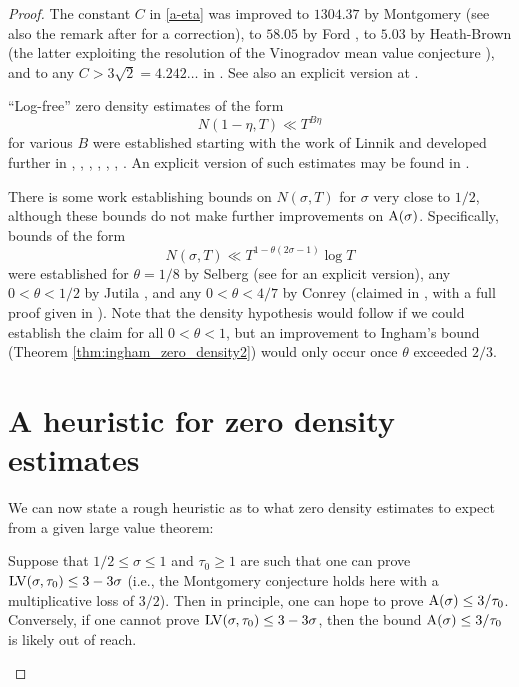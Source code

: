 \begin{proof}
The constant $C$ in \eqref{a-eta} was improved to $1304.37$ by Montgomery \cite[Theorem 12.3]{montgomery_topics_1971} (see also the remark after \cite[(11.97)]{ivic} for a correction), to $58.05$ by Ford \cite{FordZeta}, to $5.03$ by Heath-Brown \cite{heathbrown_new_2017} (the latter exploiting the resolution of the Vinogradov mean value conjecture \cite{bourgain_demeter_guth}), and to any $C > 3\sqrt{2}=4.242\dots$ in \cite{pintz_density_2023}. See also an explicit version at \cite{bellotti}.

``Log-free'' zero density estimates of the form
$$ N(1-\eta,T) \ll T^{B\eta}$$
for various $B$ were established starting with the work of Linnik \cite{linnik-1,linnik-2} and developed further in \cite{turan}, \cite{fogels}, \cite{bombieri_1974}, \cite{jutila_linnik}, \cite{gallagher_large_sieve}, \cite{graham_1978}, \cite{heath_brown_least_prime}. An explicit version of such estimates may be found in \cite{bellotti_2024}.

There is some work establishing bounds on $N(\sigma,T)$ for $\sigma$ very close to $1/2$, although these bounds do not make further improvements on $\mathrm{A}(\sigma)$.  Specifically, bounds of the form
$$ N(\sigma,T) \ll T^{1-\theta(2\sigma-1)} \log T$$
were established for $\theta=1/8$ by Selberg \cite{selberg_1946} (see \cite{simonic} for an explicit version), any $0 < \theta < 1/2$ by Jutila \cite{jutila-critical}, and any $0 < \theta < 4/7$ by Conrey (claimed in \cite{conrey_at_1989}, with a full proof given in \cite{baluyot_thesis}).  Note that the density hypothesis would follow if we could establish the claim for all $0 < \theta < 1$, but an improvement to Ingham's bound (Theorem \ref{thm:ingham_zero_density2}) would only occur once $\theta$ exceeded $2/3$.

\section{A heuristic for zero density estimates}

We can now state a rough heuristic as to what zero density estimates to expect from a given large value theorem:

\begin{heuristic}\label{lv-heuristic} Suppose that $1/2 \leq \sigma \leq 1$ and $\tau_0 \geq 1$ are such that one can prove $\mathrm{LV}(\sigma, \tau_0) \leq 3-3\sigma$ (i.e., the Montgomery conjecture holds here with a multiplicative loss of $3/2$).  Then in principle, one can hope to prove $\mathrm{A}(\sigma) \leq 3/\tau_0$.  Conversely, if one cannot prove $\mathrm{LV}(\sigma, \tau_0) \leq 3-3\sigma$, then the bound $\mathrm{A}(\sigma) \leq 3/\tau_0$ is likely out of reach.
\end{heuristic}


\end{proof}
